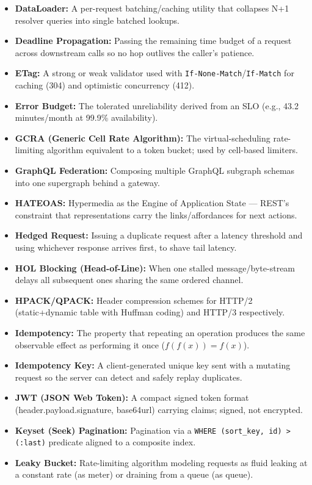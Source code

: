 \documentclass[12pt, a4paper, twoside, openright]{book}
\theoremstyle{definition}
\theoremstyle{remark}
\begin{document}
\begin{itemize}
  \item \textbf{DataLoader:} A per-request batching/caching utility that collapses N+1 resolver queries into single batched lookups.
  \item \textbf{Deadline Propagation:} Passing the remaining time budget of a request across downstream calls so no hop outlives the caller's patience.
  \item \textbf{ETag:} A strong or weak validator used with \texttt{If-None-Match}/\texttt{If-Match} for caching (304) and optimistic concurrency (412).
  \item \textbf{Error Budget:} The tolerated unreliability derived from an SLO (e.g., 43.2 minutes/month at 99.9\% availability).
  \item \textbf{GCRA (Generic Cell Rate Algorithm):} The virtual-scheduling rate-limiting algorithm equivalent to a token bucket; used by cell-based limiters.
  \item \textbf{GraphQL Federation:} Composing multiple GraphQL subgraph schemas into one supergraph behind a gateway.
  \item \textbf{HATEOAS:} Hypermedia as the Engine of Application State — REST's constraint that representations carry the links/affordances for next actions.
  \item \textbf{Hedged Request:} Issuing a duplicate request after a latency threshold and using whichever response arrives first, to shave tail latency.
  \item \textbf{HOL Blocking (Head-of-Line):} When one stalled message/byte-stream delays all subsequent ones sharing the same ordered channel.
  \item \textbf{HPACK/QPACK:} Header compression schemes for HTTP/2 (static+dynamic table with Huffman coding) and HTTP/3 respectively.
  \item \textbf{Idempotency:} The property that repeating an operation produces the same observable effect as performing it once ($f(f(x)) = f(x)$).
  \item \textbf{Idempotency Key:} A client-generated unique key sent with a mutating request so the server can detect and safely replay duplicates.
  \item \textbf{JWT (JSON Web Token):} A compact signed token format (header.payload.signature, base64url) carrying claims; signed, not encrypted.
  \item \textbf{Keyset (Seek) Pagination:} Pagination via a \texttt{WHERE (sort\_key, id) > (:last)} predicate aligned to a composite index.
  \item \textbf{Leaky Bucket:} Rate-limiting algorithm modeling requests as fluid leaking at a constant rate (as meter) or draining from a queue (as queue).

\end{itemize}
\end{document}
